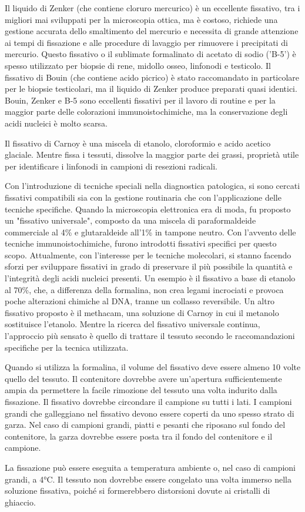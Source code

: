 Il liquido di Zenker (che contiene cloruro mercurico) è un eccellente fissativo, tra i migliori mai sviluppati per la microscopia ottica, ma è costoso, richiede una gestione accurata dello smaltimento del mercurio e necessita di grande attenzione ai tempi di fissazione e alle procedure di lavaggio per rimuovere i precipitati di mercurio. Questo fissativo o il sublimate formalinato di acetato di sodio ('B-5') è spesso utilizzato per biopsie di rene, midollo osseo, linfonodi e testicolo. Il fissativo di Bouin (che contiene acido picrico) è stato raccomandato in particolare per le biopsie testicolari, ma il liquido di Zenker produce preparati quasi identici. Bouin, Zenker e B-5 sono eccellenti fissativi per il lavoro di routine e per la maggior parte delle colorazioni immunoistochimiche, ma la conservazione degli acidi nucleici è molto scarsa.

Il fissativo di Carnoy è una miscela di etanolo, cloroformio e acido acetico glaciale. Mentre fissa i tessuti, dissolve la maggior parte dei grassi, proprietà utile per identificare i linfonodi in campioni di resezioni radicali.

Con l'introduzione di tecniche speciali nella diagnostica patologica, si sono cercati fissativi compatibili sia con la gestione routinaria che con l'applicazione delle tecniche specifiche. Quando la microscopia elettronica era di moda, fu proposto un "fissativo universale", composto da una miscela di paraformaldeide commerciale al 4\% e glutaraldeide all'1\% in tampone neutro. Con l'avvento delle tecniche immunoistochimiche, furono introdotti fissativi specifici per questo scopo. Attualmente, con l'interesse per le tecniche molecolari, si stanno facendo sforzi per sviluppare fissativi in grado di preservare il più possibile la quantità e l'integrità degli acidi nucleici presenti. Un esempio è il fissativo a base di etanolo al 70\%, che, a differenza della formalina, non crea legami incrociati e provoca poche alterazioni chimiche al DNA, tranne un collasso reversibile. Un altro fissativo proposto è il methacam, una soluzione di Carnoy in cui il metanolo sostituisce l'etanolo. Mentre la ricerca del fissativo universale continua, l'approccio più sensato è quello di trattare il tessuto secondo le raccomandazioni specifiche per la tecnica utilizzata.

Quando si utilizza la formalina, il volume del fissativo deve essere almeno 10 volte quello del tessuto. Il contenitore dovrebbe avere un'apertura sufficientemente ampia da permettere la facile rimozione del tessuto una volta indurito dalla fissazione. Il fissativo dovrebbe circondare il campione su tutti i lati. I campioni grandi che galleggiano nel fissativo devono essere coperti da uno spesso strato di garza. Nel caso di campioni grandi, piatti e pesanti che riposano sul fondo del contenitore, la garza dovrebbe essere posta tra il fondo del contenitore e il campione.

La fissazione può essere eseguita a temperatura ambiente o, nel caso di campioni grandi, a 4°C. Il tessuto non dovrebbe essere congelato una volta immerso nella soluzione fissativa, poiché si formerebbero distorsioni dovute ai cristalli di ghiaccio.
